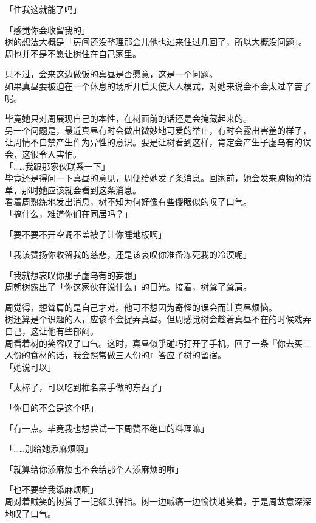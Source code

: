 「住我这就能了吗」

「感觉你会收留我的」\\

树的想法大概是「房间还没整理那会儿他也过来住过几回了，所以大概没问题」。\\

周也并不是不愿让树住在自己家里。

只不过，会来这边做饭的真昼是否愿意，这是一个问题。\\

如果真昼要被迫在一个休息的场所开启天使大人模式，对她来说会不会太过辛苦了呢。

毕竟她只对周展现自己的本性，在树面前的话还是会掩藏起来的。\\

另一个问题是，最近真昼有时会做出微妙地可爱的举止，有时会露出害羞的样子，让周情不自禁产生作为异性的意识。要是让树看到这样，肯定会产生子虚乌有的误会，这很令人害怕。\\

「……我跟那家伙联系一下」\\

毕竟还是得问一下真昼的意见，周便给她发了条消息。回家前，她会发来购物的清单，那时她应该就会看到这条消息。\\

看着周熟练地发出消息，树不知为何好像有些傻眼似的叹了口气。\\

「搞什么，难道你们在同居吗？」

「要不要不开空调不盖被子让你睡地板啊」

「我该赞扬你收留我的慈悲，还是该哀叹你准备冻死我的冷漠呢」

「我就想哀叹你那子虚乌有的妄想」\\

周朝树露出了「你这家伙在说什么」的目光。接着，树耸了耸肩。

周觉得，想耸肩的是自己才对。他可不想因为奇怪的误会而让真昼烦恼。\\

树还算是个识趣的人，应该不会捉弄真昼。但周感觉树会趁着真昼不在的时候戏弄自己，这让他有些郁闷。\\

周看着树的笑容叹了口气。这时，真昼似乎碰巧打开了手机，回了一条『你去买三人份的食材的话，我会照常做三人份的』答应了树的留宿。\\

「她说可以」

「太棒了，可以吃到椎名亲手做的东西了」

「你目的不会是这个吧」

「有一点。毕竟我也想尝试一下周赞不绝口的料理嘛」

「……别给她添麻烦啊」

「就算给你添麻烦也不会给那个人添麻烦的啦」

「也不要给我添麻烦啊」\\

周对着贼笑的树赏了一记额头弹指。树一边喊痛一边愉快地笑着，于是周故意深深地叹了口气。
